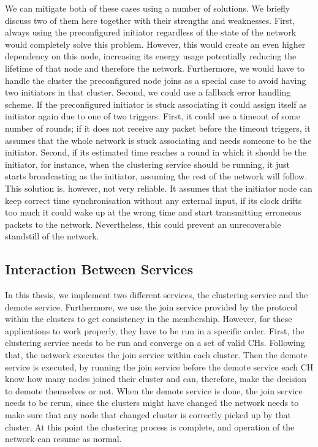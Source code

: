 We can mitigate both of these cases using a number of solutions. We briefly discuss two of them here together with their strengths and weaknesses. First, always using the preconfigured initiator regardless of the state of the network would completely solve this problem. However, this would create an even higher dependency on this node, increasing its energy usage potentially reducing the lifetime of that node and therefore the network. Furthermore, we would have to handle the cluster the preconfigured node joins as a special case to avoid having two initiators in that cluster. Second, we could use a fallback error handling scheme. If the preconfigured initiator is stuck associating it could assign itself as initiator again due to one of two triggers. First, it could use a timeout of some number of rounds; if it does not receive any packet before the timeout triggers, it assumes that the whole network is stuck associating and needs someone to be the initiator. Second, if its estimated time reaches a round in which it should be the initiator, for instance, when the clustering service should be running, it just starts broadcasting as the initiator, assuming the rest of the network will follow. This solution is, however, not very reliable. It assumes that the initiator node can keep correct time synchronisation without any external input, if its clock drifts too much it could wake up at the wrong time and start transmitting erroneous packets to the network. Nevertheless, this could prevent an unrecoverable standstill of the network.



\subsection{Interaction Between Services}
\label{subsec:interaction-between-services}
In this thesis, we implement two different services, the clustering service and the demote service. Furthermore, we use the join service provided by the \atwo{} protocol within the clusters to get consistency in the membership. However, for these applications to work properly, they have to be run in a specific order. First, the clustering service needs to be run and converge on a set of valid CHs. Following that, the network executes the join service within each cluster. Then the demote service is executed, by running the join service before the demote service each CH know how many nodes joined their cluster and can, therefore, make the decision to demote themselves or not. When the demote service is done, the join service needs to be rerun, since the clusters might have changed the network needs to make sure that any node that changed cluster is correctly picked up by that cluster. At this point the clustering process is complete, and operation of the network can resume as normal.




